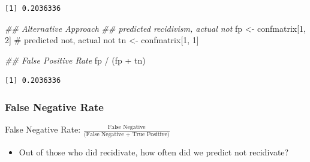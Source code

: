 \documentclass[
  letterpaper,
  DIV=11,
  numbers=noendperiod]{scrreprt}
\newenvironment{Shaded}{\begin{snugshade}}{\end{snugshade}}
\newcommand{\CommentTok}[1]{\textcolor[rgb]{0.37,0.37,0.37}{#1}}
\newcommand{\DecValTok}[1]{\textcolor[rgb]{0.68,0.00,0.00}{#1}}
\newcommand{\DocumentationTok}[1]{\textcolor[rgb]{0.37,0.37,0.37}{\textit{#1}}}
\newcommand{\FunctionTok}[1]{\textcolor[rgb]{0.28,0.35,0.67}{#1}}
\newcommand{\NormalTok}[1]{\textcolor[rgb]{0.00,0.23,0.31}{#1}}
\newcommand{\OtherTok}[1]{\textcolor[rgb]{0.00,0.23,0.31}{#1}}
\newcommand{\SpecialCharTok}[1]{\textcolor[rgb]{0.37,0.37,0.37}{#1}}
\providecommand{\tightlist}{%
  \setlength{\itemsep}{0pt}\setlength{\parskip}{0pt}}\usepackage{longtable,booktabs,array}
\begin{document}
\begin{verbatim}
[1] 0.2036336
\end{verbatim}

\begin{Shaded}
\begin{Highlighting}[]
\DocumentationTok{\#\# Alternative Approach}
\DocumentationTok{\#\# predicted recidivism, actual not}
\NormalTok{fp }\OtherTok{\textless{}{-}}\NormalTok{ confmatrix[}\DecValTok{1}\NormalTok{, }\DecValTok{2}\NormalTok{]}
\CommentTok{\# predicted not, actual not}
\NormalTok{tn }\OtherTok{\textless{}{-}}\NormalTok{ confmatrix[}\DecValTok{1}\NormalTok{, }\DecValTok{1}\NormalTok{]}

\DocumentationTok{\#\# False Positive Rate}
\NormalTok{fp }\SpecialCharTok{/}\NormalTok{ (fp }\SpecialCharTok{+}\NormalTok{ tn)}
\end{Highlighting}
\end{Shaded}

\begin{verbatim}
[1] 0.2036336
\end{verbatim}

\hypertarget{false-negative-rate}{%
\subsubsection{False Negative Rate}\label{false-negative-rate}}

False Negative Rate:
\(\frac{\text{False Negative}}{\text{(False Negative + True Positive)}}\)

\begin{itemize}
\tightlist
\item
  Out of those who did recidivate, how often did we predict not
  recidivate?
\end{itemize}

\begin{Shaded}
\end{Shaded}
\end{document}
